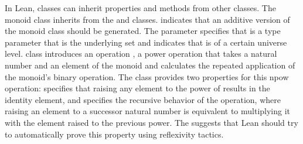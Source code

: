 In Lean, classes can inherit properties and methods from other classes. The
monoid class inherits from the  and
 classes. 
indicates that an additive version of the monoid class should be generated. The
parameter  specifies that  is a type
parameter that is the underlying set and  indicates
that  is of a certain universe level.  class
introduces an operation , a power operation that takes a
natural number and an element of the monoid and calculates the repeated
application of the monoid's binary operation. The class provides two properties
for this npow operation:  specifies that raising
any element to the power of  results in the identity element, and
 specifies the recursive behavior of the
 operation, where raising an element to a successor
natural number is equivalent to multiplying it with the element raised to the
previous power. The  suggests that Lean should
try to automatically prove this property using reflexivity tactics.

